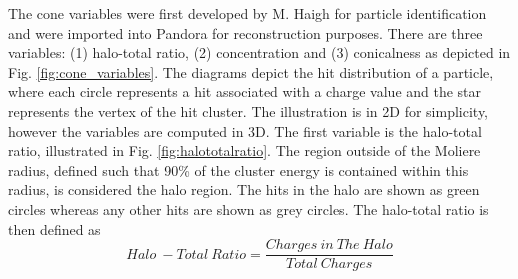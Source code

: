 The cone variables were first developed by M. Haigh for particle identification \cite{warwick_pid} and were imported into Pandora for reconstruction purposes.
There are three variables: (1) halo-total ratio, (2) concentration and (3) conicalness as depicted in Fig. \ref{fig:cone_variables}.
The diagrams depict the hit distribution of a particle, where each circle represents a hit associated with a charge value and the star represents the vertex of the hit cluster.
The illustration is in 2D for simplicity, however the variables are computed in 3D.
The first variable is the halo-total ratio, illustrated in Fig. \ref{fig:halototalratio}.
The region outside of the Moliere radius, defined such that 90\% of the cluster energy is contained within this radius, is considered the halo region.
The hits in the halo are shown as green circles whereas any other hits are shown as grey circles.
The halo-total ratio is then defined as 
\begin{equation}
	Halo\ - Total\ Ratio = \frac{Charges\ in\ The\ Halo}{Total\ Charges}
\end{equation}


